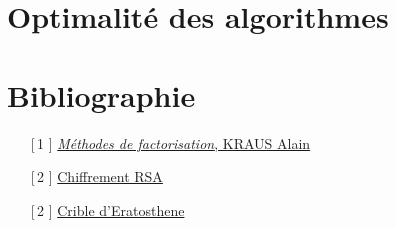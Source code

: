 \documentclass[a4paper]{report}
\theoremstyle{plain}
\theoremstyle{definition}
\begin{document}
    \chapter{Optimalité des algorithmes}
    \label{Graphique}
    

    \chapter*{Bibliographie}
        \begin{enumerate}

    	\item[[\,1\!\!]] \href{https://www.math.univ-paris13.fr/~boyer/enseignement/crypto/Chap6.pdf}{\textit{Méthodes de factorisation}, KRAUS Alain}
    	\item[[\,2\!\!]] \href{https://fr.wikipedia.org/wiki/Chiffrement_RSA}{Chiffrement RSA}
    	\item[[\,2\!\!]] \href{https://fr.wikipedia.org/wiki/Crible_d%27%C3%89ratosth%C3%A8ne}{Crible d'Eratosthene}
           
        \end{enumerate}
\end{document}
